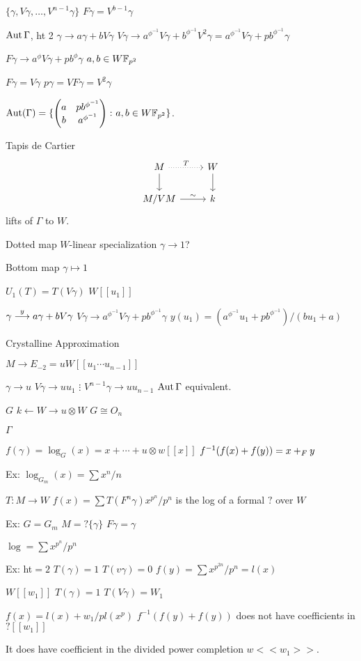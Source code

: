 $\{\gamma, V \gamma, \ldots, V^{n-1} \gamma\}$
$F\gamma= V^{b-1} \gamma$

$\operatorname{Aut} \Gamma$, ht 2
$\gamma \to a \gamma + b V \gamma$
$V\gamma \to a^{\phi^{-1}} V \gamma + b^{\phi^{-1}} V^2 \gamma = a^{\phi^{-1}} V \gamma + p b^{\phi^{-1}} \gamma$

$F\gamma \to a^{\phi} V \gamma + p b^\phi \gamma$
$a,b \in W\mathbb{F}_{p^2}$

$F\gamma = V\gamma$
$p \gamma = VF\gamma= V^2 \gamma$

$\operatorname{Aut}(\Gamma)= \{ \begin{pmatrix} a & pb^{\phi^{-1}} \\ b & a^{\phi^{-1}} \end{pmatrix} \colon a,b \in W\mathbb{F}_{p^2}\}$. 


Tapis de Cartier
	\[
	\begin{tikzcd}
	M \arrow[dotted]{r}{T} \arrow{d} & W \arrow{d} \\
	M/VM \arrow{r}{\sim} & k
	\end{tikzcd}
	\]
lifts of $\Gamma$ to $W$. 


Dotted map $W$-linear specialization $\gamma \to 1$?

Bottom map $\gamma \mapsto 1$

$U_1(T)= T(V\gamma)$
$W[[u_1]]$

$\gamma \stackrel{y}{\longrightarrow} a \gamma + bV \gamma$
$V \gamma \to a^{\phi^{-1}} V \gamma + p b^{\phi^{-1}} \gamma$
$y(u_1)= (a^{\phi^{-1}} u_1 + pb^{\phi^{-1}})/(bu_1+a)$



Crystalline Approximation

$M \to E_{-2}= uW[[u_1 \cdots u_{n-1}]]$

$\gamma \to u$
$V \gamma \to uu_1$
$\vdots$
$V^{n-1}\gamma \to uu_{n-1}$
$\operatorname{Aut} \Gamma$ equivalent. 

$G$
$k \leftarrow W \rightarrow u \otimes W$ 
$G \cong O_n$

$\Gamma$

$f(\gamma) = \log_G(x)= x+ \cdots + u \otimes w[[x]]$
$f^{-1}(f(x)+f(y))= x +_F y$


Ex: $\log_{G_m}(x)= \sum x^n/n$

$T: M \to W$
$f(x)= \sum T(F^n \gamma) x^{p^n}/p^n$
is the log of a formal $?$ over $W$


Ex: $G= G_m$
$M= ?\{\gamma\}$
$F\gamma= \gamma$

$\log = \sum x^{p^n}/p^n$

Ex: ht$=2$ 
$T(\gamma)=1$
$T(v\gamma)=0$
$f(y)= \sum x^{p^{2n}}/p^n= l(x)$

$W[[w_1]]$
$T(\gamma)=1$
$T(V\gamma)=W_1$

$f(x)= l(x)+ w_1/p l(x^p)$
$f^{-1}(f(y)+f(y))$ does not have coefficients in $?[[w_1]]$

It does have coefficient in the divided power completion $w<<w_1>>$. 






































